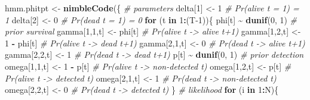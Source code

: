 \documentclass[
  12pt,
]{krantz}
\newenvironment{Shaded}{\begin{snugshade}}{\end{snugshade}}
\newcommand{\CommentTok}[1]{\textcolor[rgb]{0.56,0.35,0.01}{\textit{#1}}}
\newcommand{\ControlFlowTok}[1]{\textcolor[rgb]{0.13,0.29,0.53}{\textbf{#1}}}
\newcommand{\DecValTok}[1]{\textcolor[rgb]{0.00,0.00,0.81}{#1}}
\newcommand{\FunctionTok}[1]{\textcolor[rgb]{0.13,0.29,0.53}{\textbf{#1}}}
\newcommand{\NormalTok}[1]{#1}
\newcommand{\OtherTok}[1]{\textcolor[rgb]{0.56,0.35,0.01}{#1}}
\newcommand{\SpecialCharTok}[1]{\textcolor[rgb]{0.81,0.36,0.00}{\textbf{#1}}}
\begin{document}
\begin{Shaded}
\begin{Highlighting}[]
\NormalTok{hmm.phitpt }\OtherTok{\textless{}{-}} \FunctionTok{nimbleCode}\NormalTok{(\{}
  \CommentTok{\# parameters}
\NormalTok{  delta[}\DecValTok{1}\NormalTok{] }\OtherTok{\textless{}{-}} \DecValTok{1}                 \CommentTok{\# Pr(alive t = 1) = 1}
\NormalTok{  delta[}\DecValTok{2}\NormalTok{] }\OtherTok{\textless{}{-}} \DecValTok{0}                 \CommentTok{\# Pr(dead t = 1) = 0}
  \ControlFlowTok{for}\NormalTok{ (t }\ControlFlowTok{in} \DecValTok{1}\SpecialCharTok{:}\NormalTok{(T}\DecValTok{{-}1}\NormalTok{))\{}
\NormalTok{    phi[t] }\SpecialCharTok{\textasciitilde{}} \FunctionTok{dunif}\NormalTok{(}\DecValTok{0}\NormalTok{, }\DecValTok{1}\NormalTok{)        }\CommentTok{\# prior survival}
\NormalTok{    gamma[}\DecValTok{1}\NormalTok{,}\DecValTok{1}\NormalTok{,t] }\OtherTok{\textless{}{-}}\NormalTok{ phi[t]      }\CommentTok{\# Pr(alive t {-}\textgreater{} alive t+1)}
\NormalTok{    gamma[}\DecValTok{1}\NormalTok{,}\DecValTok{2}\NormalTok{,t] }\OtherTok{\textless{}{-}} \DecValTok{1} \SpecialCharTok{{-}}\NormalTok{ phi[t]  }\CommentTok{\# Pr(alive t {-}\textgreater{} dead t+1)}
\NormalTok{    gamma[}\DecValTok{2}\NormalTok{,}\DecValTok{1}\NormalTok{,t] }\OtherTok{\textless{}{-}} \DecValTok{0}           \CommentTok{\# Pr(dead t {-}\textgreater{} alive t+1)}
\NormalTok{    gamma[}\DecValTok{2}\NormalTok{,}\DecValTok{2}\NormalTok{,t] }\OtherTok{\textless{}{-}} \DecValTok{1}           \CommentTok{\# Pr(dead t {-}\textgreater{} dead t+1)}
\NormalTok{    p[t] }\SpecialCharTok{\textasciitilde{}} \FunctionTok{dunif}\NormalTok{(}\DecValTok{0}\NormalTok{, }\DecValTok{1}\NormalTok{)          }\CommentTok{\# prior detection}
\NormalTok{    omega[}\DecValTok{1}\NormalTok{,}\DecValTok{1}\NormalTok{,t] }\OtherTok{\textless{}{-}} \DecValTok{1} \SpecialCharTok{{-}}\NormalTok{ p[t]    }\CommentTok{\# Pr(alive t {-}\textgreater{} non{-}detected t)}
\NormalTok{    omega[}\DecValTok{1}\NormalTok{,}\DecValTok{2}\NormalTok{,t] }\OtherTok{\textless{}{-}}\NormalTok{ p[t]        }\CommentTok{\# Pr(alive t {-}\textgreater{} detected t)}
\NormalTok{    omega[}\DecValTok{2}\NormalTok{,}\DecValTok{1}\NormalTok{,t] }\OtherTok{\textless{}{-}} \DecValTok{1}           \CommentTok{\# Pr(dead t {-}\textgreater{} non{-}detected t)}
\NormalTok{    omega[}\DecValTok{2}\NormalTok{,}\DecValTok{2}\NormalTok{,t] }\OtherTok{\textless{}{-}} \DecValTok{0}           \CommentTok{\# Pr(dead t {-}\textgreater{} detected t)}
\NormalTok{  \}}
  \CommentTok{\# likelihood}
  \ControlFlowTok{for}\NormalTok{ (i }\ControlFlowTok{in} \DecValTok{1}\SpecialCharTok{:}\NormalTok{N)\{}

\end{Highlighting}
\end{Shaded}
\end{document}
